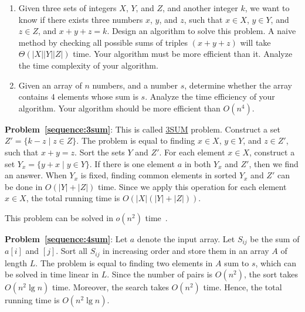 \begin{Exercise}
\begin{enumerate}
\item Given three sets of integers $X$, $Y$, and $Z$, and another integer $k$, we want to know if there exists three numbers $x$, $y$, and $z$, such that $x \in X$, $y \in Y$, and $z \in Z$, and $x + y + z = k$. Design an algorithm to solve this problem. A naive method by checking all possible sums of triples $(x+y+z)$ will take $\Theta(|X||Y||Z|)$ time. Your algorithm must be more efficient than it. Analyze the time complexity of your algorithm. \label{sequence:3sum} 
\item Given an array of $n$ numbers, and a number $s$, determine whether the array contains $4$ elements whose sum is $s$. Analyze the time efficiency of your algorithm. Your algorithm should be more efficient than $O(n^4)$.  \label{sequence:4sum}  
\end{enumerate}
\end{Exercise}
\begin{Answer}
{\bf Problem~\ref{sequence:3sum}}: This is called \href{https://en.wikipedia.org/wiki/3SUM}{3SUM} problem. Construct a set $Z' = \{k - z \mid z \in Z\}$. The problem is equal to finding $x \in X$, $y \in Y$, and $z \in Z'$, such that $x + y = z$. Sort the sets $Y$ and $Z'$. For each element $x \in X$, construct a set $Y_x = \{y + x \mid y \in Y\}$. If there is one element $a$ in both  $Y_x$ and $Z'$, then we find an answer. When $Y_x$ is fixed, finding common elements in sorted $Y_x$ and $Z'$ can be done in $O(|Y|+|Z|)$ time. Since we apply this operation for each element $x \in X$, the total running time is $O(|X|(|Y|+|Z|))$.

This problem can be solved in $o(n^2)$ time~\cite{Jorgensen2014}.

{\bf Problem~\ref{sequence:4sum}}: Let $a$ denote the input array. Let $S_{ij}$ be the sum of $a[i]$ and $[j]$. Sort all $S_{ij}$ in increasing order and store them in an array $A$ of length $L$. The problem is equal to finding two elements in $A$ sum to $s$, which can be solved in time linear in $L$. Since the number of pairs is $O(n^2)$, the sort takes $O(n^2 \lg n)$ time. Moreover, the search takes $O(n^2)$ time. Hence, the total running time is $O(n^2 \lg n)$.
\end{Answer}


